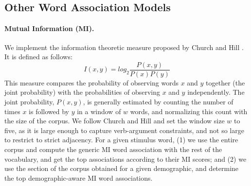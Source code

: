\documentclass[11pt,letterpaper]{article}
\begin{document}
\subsection{Other Word Association Models}


\paragraph{Mutual Information (MI).}
We implement the information theoretic measure proposed by Church and Hill .
It is defined as follows:
\begin{equation}
I(x, y) = log_{2}\frac{P(x, y)}{P(x)P(y)}
\end{equation}
This measure compares the probability of observing words $x$ and $y$ together (the joint probability) with the probabilities of observing $x$ and $y$ independently. 
The joint probability, $P(x, y)$, is generally estimated by counting the number of times $x$ is followed by $y$ in a window of $w$ words, and normalizing this count with the size of the corpus. 
We follow Church and Hill and set the window size $w$ to five, as it is large enough to capture verb-argument constraints, and not so large to restrict to strict adjacency. 
For a given stimulus word, (1) we use the entire corpus and compute the generic MI word association with the rest of the vocabulary, and get the top associations according to their MI scores; and (2) we use the section of the corpus obtained for a given demographic, and determine the top  demographic-aware MI word associations. 
\end{document}
